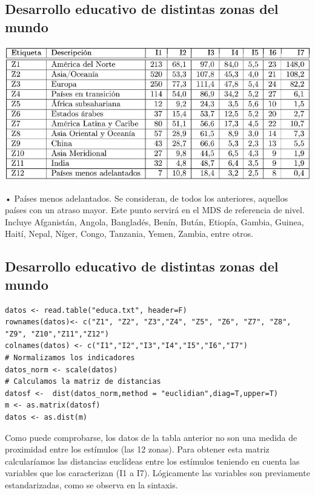 \documentclass[]{article}
\begin{document}
\subsection{Desarrollo educativo de distintas zonas del
mundo}\label{desarrollo-educativo-de-distintas-zonas-del-mundo-3}

\hypertarget{left}{}
\includegraphics[width=1\linewidth]{images/cuadro}

\hypertarget{right}{}
• Países menos adelantados. Se consideran, de todos los anteriores,
aquellos países con un atraso mayor. Este punto servirá en el MDS de
referencia de nivel. Incluye Afganistán, Angola, Bangladés, Benín,
Bután, Etiopía, Gambia, Guinea, Haití, Nepal, Níger, Congo, Tanzania,
Yemen, Zambia, entre otros.

\subsection{Desarrollo educativo de distintas zonas del
mundo}\label{desarrollo-educativo-de-distintas-zonas-del-mundo-4}

\hypertarget{left}{}
\begin{verbatim}
datos <- read.table("educa.txt", header=F)
rownames(datos)<- c("Z1", "Z2", "Z3","Z4", "Z5", "Z6", "Z7", "Z8", "Z9", "Z10","Z11","Z12")
colnames(datos) <- c("I1","I2","I3","I4","I5","I6","I7")
# Normalizamos los indicadores
datos_norm <- scale(datos)
# Calculamos la matriz de distancias
datosf <-  dist(datos_norm,method = "euclidian",diag=T,upper=T)
m <- as.matrix(datosf)
datos <- as.dist(m)
\end{verbatim}

\hypertarget{right}{}
Como puede comprobarse, los datos de la tabla anterior no son una medida
de proximidad entre los estímulos (las 12 zonas). Para obtener esta
matriz calcularíamos las distancias euclídeas entre los estímulos
teniendo en cuenta las variables que los caracterizan (I1 a I7).
Lógicamente las variables son previamente estandarizadas, como se
observa en la sintaxis.
\end{document}
